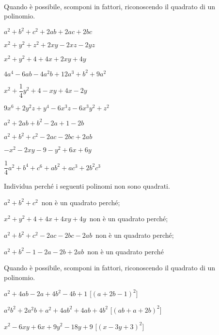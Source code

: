 \paragraph*{}

\begin{esercizio}
\label{ese:16.13}
Quando è possibile, scomponi in fattori, riconoscendo il quadrato di un 
polinomio.
\begin{multicols}{2}
\begin{enumeratea}
 \item \(a^{2}+b^{2}+c^{2}+2ab+2ac+2bc\)
 \item \(x^{2}+y^{2}+z^{2}+2xy-2xz-2yz\)
 \item \(x^{2}+y^{2}+4+4x+2xy+4y\)
 \item \(4a^{4}-6{ab}-4a^{2}b+12a^{3}+b^{2}+9a^{2}\)
 \item \(x^{2}+\dfrac{1}{4}y^{2}+4-xy+4x-2y\)
 \item \(9x^{6}+2y^{2}z+y^{4}-6x^{3}z-6x^{3}y^{2}+z^{2}\)
 \item \(a^{2}+2ab+b^{2}-2a+1-2b\)
 \item \(a^{2}+b^{2}+c^{2}-2ac-2bc+2ab\)
 \item \(-x^{2}-2xy-9-y^{2}+6x+6y\)
 \item \(\dfrac{1}{4}a^{2}+b^{4}+c^{6}+ab^{2}+{ac}^{3}+2b^{2}c^{3}\)
\end{enumeratea}
\end{multicols}
\end{esercizio}

\begin{esercizio}
Individua perché i seguenti polinomi non sono quadrati.
\label{ese:16.16}
\begin{enumeratea}
 \item \(a^{2}+b^{2}+c^{2}\)\, non è un quadrato perché\dotfill;
 \item \(x^{2}+y^{2}+4+4x+4xy+4y\)\, non è un quadrato perché\dotfill;
 \item \(a^{2}+b^{2}+c^{2}-2ac-2bc-2ab\)\, non è un quadrato perché\dotfill;
 \item \(a^{2}+b^{2}-1-2a-2b+2ab\)\, non è un quadrato perché\dotfill
\end{enumeratea}
\end{esercizio}

\begin{esercizio}[\Ast]
\label{ese:16.17}
Quando è possibile, scomponi in fattori, riconoscendo il quadrato di un polinomio.
\begin{enumeratea}
 \item \(a^{2}+4ab-2a+4b^{2}-4b+1\)
  \hfill [\((a+2b-1)^{2}\)]
 \item \(a^{2}b^{2}+2a^{2}b+a^{2}+4ab^{2}+4ab+4b^{2}\)
  \hfill [\((ab+a+2b)^{2}\)]
 \item \(x^{2}-6xy+6x+9y^{2}-18y+9\)
  \hfill [\((x-3y+3)^{2}\)]
\end{enumeratea}
\end{esercizio}


